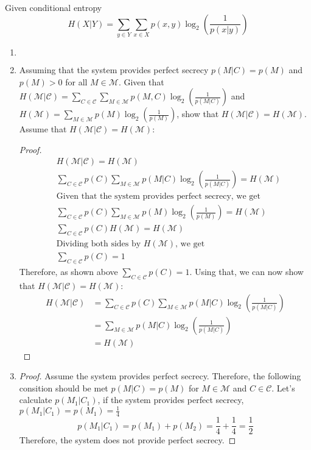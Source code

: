 \documentclass[11pt]{article}
\newcommand{\M}{\mathcal{M}}
\newcommand{\C}{\mathcal{C}}
\newcommand{\logbin}{\log_2}
\theoremstyle{definition}
\begin{document}
Given conditional entropy
\[
  H(X|Y) = \sum_{y \in Y}\sum_{x \in X}p(x, y)\logbin (\frac{1}{p(x|y)})
\]
\begin{enumerate}
  \item
    \begin{equation*}
    \begin{aligned}
    \end{aligned}
    \end{equation*}
  \item
    Assuming that the system provides perfect secrecy $p(M|C) = p(M)$ and $p(M) > 0$ for all $M \in \M$. Given that $H(\M|\C) = \sum_{C \in \C}\sum_{M \in \M}p(M, C)\logbin (\frac{1}{p(M|C)})$ and $H(\M) = \sum_{M \in \M}p(M)\logbin(\frac{1}{p(M)})$, show that $H(\M|\C) = H(\M)$. Assume that $H(\M|\C) = H(\M)$:
    \begin{proof}
      \begin{equation*}
      \begin{aligned}
        & H(\M|\C) = H(\M) \\
        & \sum_{C \in \C}p(C)\sum_{M \in \M}p(M|C)\logbin (\frac{1}{p(M|C)}) = H(\M) \\
        & \text{Given that the system provides perfect secrecy, we get} \\
        & \sum_{C \in \C}p(C)\sum_{M \in \M}p(M)\logbin (\frac{1}{p(M)}) = H(\M) \\
        & \sum_{C \in \C}p(C)H(\M) = H(\M) \\
        & \text{Dividing both sides by $H(\M)$, we get} \\
        & \sum_{C \in \C}p(C) = 1
      \end{aligned}
      \end{equation*}
      Therefore, as shown above $\sum_{C \in \C}p(C) = 1$. Using that, we can now show that $H(\M|\C) = H(\M)$:
      \begin{equation*}
      \begin{aligned}
        H(\M|\C) &= \sum_{C \in \C}p(C)\sum_{M \in \M}p(M|C)\logbin (\frac{1}{p(M|C)}) \\
                   &= \sum_{M \in \M}p(M|C)\logbin (\frac{1}{p(M|C)}) \\
                   &= H(\M)
      \end{aligned}
      \end{equation*}
    \end{proof}
  \item
    \begin{proof}
      Assume the system provides perfect secrecy. Therefore, the following consition should be met $p(M|C) = p(M)$ for $M \in \M$ and $C \in \C$. Let's calculate $p(M_1|C_1)$, if the system provides perfect secrecy, $p(M_1|C_1) = p(M_1) = \frac{1}{4}$
      \[
        p(M_1|C_1) = p(M_1) + p(M_2) = \frac{1}{4} + \frac{1}{4} = \frac{1}{2}
      \]
      Therefore, the system does not provide perfect secrecy.
    \end{proof}
\end{enumerate}
\end{document}
